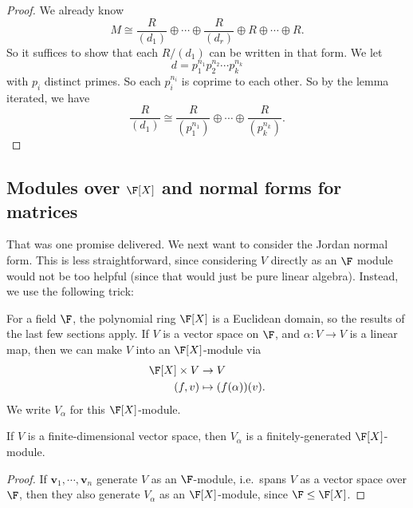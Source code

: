 \documentclass[a4paper]{article}
\begin{document}
\begin{proof}
  We already know
  \[
    M \cong \frac{R}{(d_1)} \oplus \cdots \oplus \frac{R}{(d_r)} \oplus R \oplus \cdots \oplus R.
  \]
  So it suffices to show that each $R/(d_1)$ can be written in that form. We let
  \[
    d = p_1^{n_1} p_2^{n_2} \cdots p_k^{n_k}
  \]
  with $p_i$ distinct primes. So each $p_i^{n_i}$ is coprime to each other. So by the lemma iterated, we have
  \[
    \frac{R}{(d_1)} \cong \frac{R}{(p_1^{n_1})} \oplus\cdots \oplus \frac{R}{(p_k^{n_k})}.
  \]
\end{proof}

\subsection{Modules over \texorpdfstring{$\F[X]$}{F[X]} and normal forms for matrices}
That was one promise delivered. We next want to consider the Jordan normal form. This is less straightforward, since considering $V$ directly as an $\F$ module would not be too helpful (since that would just be pure linear algebra). Instead, we use the following trick:

For a field $\F$, the polynomial ring $\F[X]$ is a Euclidean domain, so the results of the last few sections apply. If $V$ is a vector space on $\F$, and $\alpha: V \to V$ is a linear map, then we can make $V$ into an $\F[X]$-module via
\begin{align*}
  \F[X] \times V &\to V\\
  (f, v) &\mapsto (f(\alpha))(v).
\end{align*}
We write $V_\alpha$ for this $\F[X]$-module.

\begin{lemma}
  If $V$ is a finite-dimensional vector space, then $V_\alpha$ is a finitely-generated $\F[X]$-module.
\end{lemma}

\begin{proof}
  If $\mathbf{v}_1, \cdots, \mathbf{v}_n$ generate $V$ as an $\F$-module, i.e.\ spans $V$ as a vector space over $\F$, then they also generate $V_\alpha$ as an $\F[X]$-module, since $\F \leq \F[X]$.
\end{proof}
\end{document}
